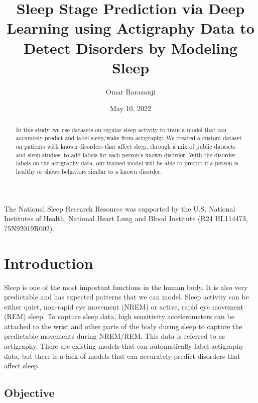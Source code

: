 \documentclass[12pt]{report}
\title{Sleep Stage Prediction via Deep Learning
using Actigraphy Data to Detect Disorders
by Modeling Sleep}
\author{Omar Barazanji}
\date{May 10, 2022} %
\begin{document}
\begin{romanpages}      %

\TitlePage 

\begin{abstract} 
  In this study, we use datasets \cite{zhang}\cite{bessone} on regular sleep activity to train a model that can accurately predict and label sleep/wake from actigraphy. We created a
  custom dataset on patients with known disorders that affect sleep, through a mix of
  public datasets and sleep studies, to add labels for each person’s known disorder.
  With the disorder labels on the actigraphy data, our trained model will be able to
  predict if a person is healthy or shows behaviors similar to a known disorder.
\end{abstract}

\begin{acknowledgments}
  The National Sleep Research Resource was supported by the U.S. National Institutes of Health, National Heart Lung and Blood Institute (R24 HL114473, 75N92019R002).
\end{acknowledgments}

\tableofcontents
\listoffigures

\printnomenclature[0.5in] %
\end{romanpages}        %


\normalem       %


\chapter{Introduction}

Sleep is one of the most important functions in the human body. It is also very predictable and has expected patterns that we can model. Sleep activity can be either quiet, non-rapid eye movement (NREM) or active, rapid eye movement (REM) sleep. To capture sleep data, high sensitivity accelerometers can be attached to the wrist and other parts of the body during sleep to capture the predictable movements during NREM/REM. This data is referred to as actigraphy. There are existing models that can automatically label actigraphy data, but there is a lack of models that can accurately predict disorders that affect sleep. 

\section{Objective}
\end{document}

